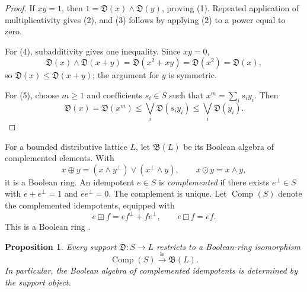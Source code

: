 \documentclass[12pt,leqno]{amsart}
\newtheorem{proposition}[theorem]{Proposition}
\theoremstyle{definition}
\numberwithin{equation}{section}
\theoremstyle{remark}
\def\leq{\leqslant}
\begin{document}
\begin{proof}
If \(xy=1\), then
\(1=\mathfrak D(x)\wedge\mathfrak D(y)\), proving (1). Repeated application of multiplicativity gives (2), and (3) follows by applying (2) to a power equal to zero.

For (4), subadditivity gives one inequality. Since \(xy=0\),
\[
\mathfrak D(x)\wedge\mathfrak D(x+y)
 =\mathfrak D(x^2+xy)
 =\mathfrak D(x^2)
 =\mathfrak D(x),
\]
so \(\mathfrak D(x)\leq\mathfrak D(x+y)\); the argument for $y$ is symmetric.

For (5), choose \(m\geq1\) and coefficients \(s_i\in S\) such that
\(x^m=\sum_i s_i y_i\). Then
\[
\mathfrak D(x)=\mathfrak D(x^m)
 \leq\bigvee_i\mathfrak D(s_i y_i)
 \leq\bigvee_i\mathfrak D(y_i).
\]
\end{proof}

For a bounded distributive lattice $L$, let \(\mathfrak B(L)\) be its Boolean algebra of complemented elements. With
\[
x\oplus y=(x\wedge y^\bot)\vee(x^\bot\wedge y),
\qquad
x\odot y=x\wedge y,
\]
it is a Boolean ring. An idempotent \(e\in S\) is \emph{complemented} if there exists \(e^\perp\in S\) with
\(e+e^\perp=1\) and \(ee^\perp=0\). The complement is unique. Let \(\operatorname{Comp}(S)\) denote the complemented idempotents, equipped with
\[
e\boxplus f=ef^\perp+fe^\perp,
\qquad
e\boxdot f=ef.
\]
This is a Boolean ring \cite[Proposition~2.1.3]{Chermnykh12}.

\begin{proposition}\label{prop:support-idempotents}
Every support \(\mathfrak D\colon S\to L\) restricts to a Boolean-ring isomorphism
\[
\operatorname{Comp}(S)\xrightarrow{\ \cong\ }\mathfrak B(L).
\]
In particular, the Boolean algebra of complemented idempotents is determined by the support object.
\end{proposition}
\end{document}
